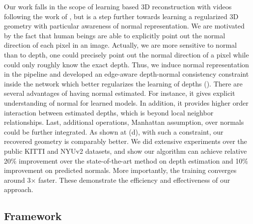 Our work falls in the scope of learning based 3D reconstruction with videos following the work of \cite{zhou2017unsupervised}, but is a step further towards learning a regularized 3D geometry with particular awareness of normal representation. 
We are motivated by the fact that human beings are able to explicitly point out the normal direction of each pixel in an image. Actually, we are more sensitive to normal than to depth, \eg one could precisely point out the normal direction of a pixel while could only roughly know the exact depth. 
Thus, we induce normal representation in the pipeline and developed an edge-aware depth-normal consistency constraint inside the network which better regularizes the learning of depths (). 
There are several advantages of having normal estimated. For instance, it gives explicit understanding of normal for learned models.  In addition, it provides higher order interaction between estimated depths, which is beyond local neighbor relationships. Last, additional operations, \eg Manhattan assumption, over normals could be further integrated.
As shown at (d), with such a constraint, our recovered geometry is comparably better. We did extensive experiments over the public KITTI and NYUv2 datasets, and show our algorithm can achieve relative 20$\%$ improvement over the state-of-the-art method on depth estimation and 10$\%$ improvement on predicted normals. More importantly, the training converges around 3$\times$ faster. These demonstrate the efficiency and effectiveness of our approach.




\vspace{-0.6\baselineskip}
\subsection{Framework}
\label{sub:framework}
\vspace{-0.3\baselineskip}

